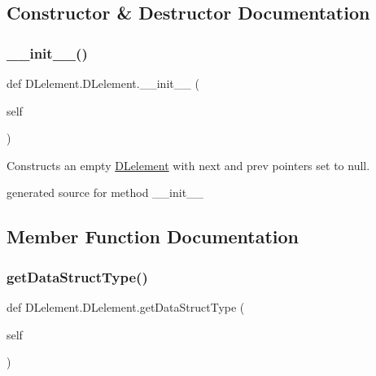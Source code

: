 \subsection{Constructor \& Destructor Documentation}
\hypertarget{class_d_lelement_1_1_d_lelement_a9d3d954a7f1ada34972349737bf2f58f}{}\label{class_d_lelement_1_1_d_lelement_a9d3d954a7f1ada34972349737bf2f58f} 
\subsubsection{\texorpdfstring{\+\_\+\+\_\+init\+\_\+\+\_\+()}{\_\_init\_\_()}}
{\footnotesize\ttfamily def D\+Lelement.\+D\+Lelement.\+\_\+\+\_\+init\+\_\+\+\_\+ (\begin{DoxyParamCaption}\item[{}]{self }\end{DoxyParamCaption})}



Constructs an empty \hyperlink{class_d_lelement_1_1_d_lelement}{D\+Lelement} with next and prev pointers set to null. 

\begin{DoxyVerb}generated source for method __init__ \end{DoxyVerb}
 

\subsection{Member Function Documentation}
\hypertarget{class_d_lelement_1_1_d_lelement_ae386146e887532ec47ca14a7a10a3dfd}{}\label{class_d_lelement_1_1_d_lelement_ae386146e887532ec47ca14a7a10a3dfd} 
\subsubsection{\texorpdfstring{get\+Data\+Struct\+Type()}{getDataStructType()}}
{\footnotesize\ttfamily def D\+Lelement.\+D\+Lelement.\+get\+Data\+Struct\+Type (\begin{DoxyParamCaption}\item[{}]{self }\end{DoxyParamCaption})}



